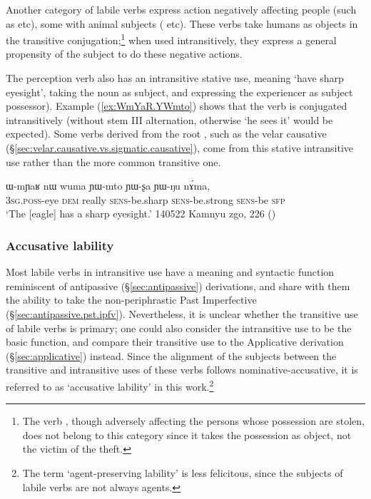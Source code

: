 Another category of labile verbs express action negatively affecting people (such as  etc), some with animal subjects ( etc).  These verbs take humans as objects in the transitive conjugation;\footnote{The verb , though adversely affecting the persons whose possession are stolen, does not belong to this category since it takes the possession as object, not the victim of the theft.} when used intransitively, they express a general propensity of the subject to do these negative actions.


The perception verb  also has an intransitive stative use, meaning `have sharp eyesight', taking the noun  as subject, and expressing the experiencer as subject possessor). Example (\ref{ex:WmYaR.YWmto}) shows that the verb  is conjugated intransitively (without stem III alternation, otherwise  `he sees it' would be expected). Some verbs derived from the root , such as the velar causative  (§\ref{sec:velar.causative.vs.sigmatic.causative}), come from this stative intransitive use rather than the more common transitive one.

\begin{exe}
\ex \label{ex:WmYaR.YWmto}
\gll ɯ-mɲaʁ nɯ wuma ɲɯ-mto ɲɯ-ʂa ɲɯ-ŋu nɤ́ma, \\
\textsc{3sg}.\textsc{poss}-eye \textsc{dem} really \textsc{sens}-be.sharp \textsc{sens}-be.strong \textsc{sens}-be \textsc{sfp} \\
\glt `The [eagle] has a sharp eyesight.' 140522 Kamnyu zgo, 226
()
\end{exe}


\subsubsection{Accusative lability} \label{sec:lability.apass}
Most labile verbs in intransitive use have a meaning and syntactic function reminiscent of antipassive (§\ref{sec:antipassive}) derivations, and share with them the ability to take the non-periphrastic Past Imperfective  (§\ref{sec:antipassive.pst.ipfv}). Nevertheless, it is unclear whether  the transitive use of labile verbs is primary; one could also consider the intransitive use to be the basic function, and compare their transitive use to the Applicative derivation (§\ref{sec:applicative}) instead. Since the alignment of the subjects between the transitive and intransitive uses of these verbs follows nominative-accusative, it is referred to as `accusative lability' in this work.\footnote{The term `agent-preserving lability' is less felicitous, since the subjects of labile verbs are not always agents.}
 
